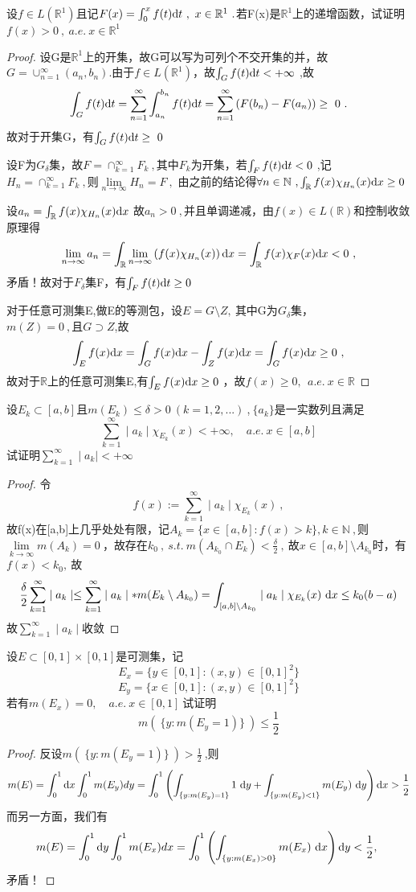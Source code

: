 设$f\in L(\mathbb{R}^1)$且记$F(x)=\int_{0}^{x}f(t)\di{t}\ ,\ x \in \mathbb{R}^1\ .$若F(x)是$\mathbb{R}^1$上的递增函数，试证明$f(x)>0\ ,\ a.e.\ x \in \mathbb{R}^1$
\begin{proof}
设G是$\mathbb{R}^1$上的开集，故G可以写为可列个不交开集的并，故$G=\cup_{n=1}^{\infty}(a_n,b_n)$.由于$f\in L(\mathbb{R}^1)$，故$\int_Gf(t)\mathrm{d}t<+\infty\ $,故$$\int_Gf(t)\mathrm{d}t=\sum_{n=1}^{\infty}\int_{a_n}^{b_n}f(t)\mathrm{d}t=\sum_{n=1}^{\infty}\left(F(b_n)-F(a_n)\right)\geq \ 0 \ .$$
故对于开集G，有$\int_Gf(t)\mathrm{d}t\geq\ 0$\par 
设F为$G_{\delta}$集，故$F=\cap_{k=1}^{\infty}F_k\ ,$其中$F_k$为开集，若$\int_Ff(t)\di{t}<0\ $,记$H_n=\cap_{k=1}^{\infty}F_k\ ,$则$\lim\limits_{n\to\infty}H_n=F\ ,$ 由之前的结论得$\forall n\in \mathbb{N}\ , \int_{\mathbb{R}}f(x)\chi_{H_n}(x)\mathrm{d}x\geq0$ \par
设$a_n=\int_{\mathbb{R}}f(x)\chi_{H_n}(x)\di{x}\ $故$a_n>0\ ,$并且单调递减，由$f(x)\in  L(\mathbb{R})$和控制收敛原理得$$\lim\limits_{n\to\infty}a_n=\int_{\mathbb{R}}\lim\limits_{n\to\infty}\left(f(x)\chi_{H_n}(x)\right)\di{x}=\int_{\mathbb{R}}f(x)\chi_{F}(x)\di{x}<0\ ,$$矛盾！故对于$F_{\delta}$集F，有$\int_Ff(t)\mathrm{d}t\geq0\ $\par 
对于任意可测集E,做E的等测包，设$E=G\setminus Z,\ $其中G为$G_{\delta}$集，$m(Z)=0\ ,且G \supset Z$,故$$\int_E f(x)\di{x}=\int_G f(x)\di{x}-\int_Z f(x)\di{x}=\int_G f(x)\di{x}\geq0\ ,$$故对于$\mathbb{R}$上的任意可测集E,有$\int_E f(x)\di{x}\geq0\ $，故$f(x)\geq0,\ \ a.e.\ x \in \mathbb{R}$
\end{proof}


设$E_k \subset[a,b]$且$m(E_k)\leq \delta >0\ (k=1,2,...)\ $,$\ \{a_k\}$是一实数列且满足$$\sum_{k=1}^{\infty}\mid a_k\mid \chi_{E_k}(x)<+\infty,\quad a.e.\ x\in [a,b]$$试证明$\sum_{k=1}^{\infty}\mid a_k\mid <+\infty$
\begin{proof}
	令$$f(x):=\sum_{k=1}^{\infty}\mid a_k\mid \chi_{E_k}(x)\ , $$故f(x)在[a,b]上几乎处处有限，记$A_k=\{x\in[a,b]:f(x)>k\},k \in \mathbb{N}\ ,$则$\lim\limits_{k\to\infty}m(A_k)=0\ ，$故存在$k_0\ ,\ s.t.\ m(A_{k_0}\cap E_k)<\frac{\delta}{2}\ ,\ $故$x\in [a,b]\setminus A_{k_0}$时，有$f(x)<k_0,\ $故$$\frac{\delta}{2}\sum_{k=1}^{\infty}\mid a_k\mid \leq \sum_{k=1}^{\infty}\mid a_k\mid *m(E_k\setminus A_{k_0})=\int_{[a,b]\setminus A_{k_0}}\mid a_k\mid\chi_{E_k}(x)\ \di{x}\leq k_0(b-a)$$
	故$\sum_{k=1}^{\infty}\mid a_k\mid$收敛
\end{proof}


设$E\subset[0,1]\times[0,1]$是可测集，记$$E_x=\{y\in [0,1]:(x,y)\in [0,1]^2\}$$$$E_y=\{x\in [0,1]:(x,y)\in [0,1]^2\}$$若有$m(E_x)=0,\quad a.e.\ x\in [0,1]\ $试证明$$m(\ \{y:m(E_y=1) \}\ )\leq \frac{1}{2}$$
\begin{proof}
	反设$m(\ \{y:m(E_y=1) \}\ )>\frac{1}{2}\ $,则$$m(E)=\int_{0}^{1}\di{x}\int_{0}^{1}m(E_y)dy = \int_{0}^{1}\left(\int_{\{y:m(E_y)=1\}}1\ \di{y}+\int_{\{y:m(E_y)<1\}}m(E_y)\ \di{y}\right)\di{x}>\frac{1}{2}$$
	而另一方面，我们有$$m(E)=\int_{0}^{1}\di{y}\int_{0}^{1}m(E_x)dx = \int_{0}^{1}\left(\int_{\{y:m(E_x)>0\}}m(E_x)\ \di{x}\right)\di{y}<\frac{1}{2},\ $$矛盾！
\end{proof}


